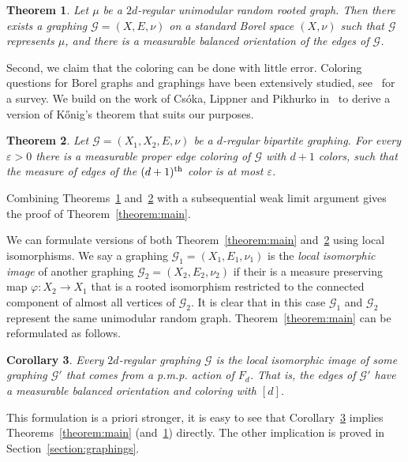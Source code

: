 \documentclass[11pt]{article}
\newtheorem{theo}{Theorem}[section]
\newtheorem{coro}[theo]{Corollary}
\theoremstyle{definition}
\numberwithin{equation}{section}
\numberwithin{figure}{section}
\numberwithin{table}{section}
\newcommand{\G}{\mathcal{G}}
\begin{document}
\begin{theo}\label{theorem:balanced_orientation}
Let $\mu$ be a $2d$-regular unimodular random rooted graph. Then there exists a graphing $\G=(X,E,\nu)$ on a standard Borel space $(X, \nu)$ such that $\G$ represents $\mu$, and there is a measurable balanced orientation of the edges of $\G$.
\end{theo}

Second, we claim that the coloring can be done with little error. Coloring questions for Borel graphs and graphings have been extensively studied, see~\cite{kechris2015descriptive} for a survey. We build on the work of Cs{\'o}ka, Lippner and Pikhurko in~\cite{csoka2016kHonig} to derive a version of K{\H o}nig's theorem that suits our purposes.

\begin{theo}\label{theorem:almost_proper_coloring}
Let $\G=(X_1,X_2,E, \nu)$ be a $d$-regular bipartite graphing. For every $\varepsilon > 0$ there is a measurable proper edge coloring of $\G$ with $d+1$ colors, such that the measure of edges of the $(d+1)^{\rm th}$ color is at most $\varepsilon$.
\end{theo}
Combining Theorems~\ref{theorem:balanced_orientation} and~\ref{theorem:almost_proper_coloring} with a subsequential weak limit argument gives the proof of Theorem~\ref{theorem:main}.
%

We can formulate versions of both Theorem~\ref{theorem:main} and~\ref{theorem:almost_proper_coloring} using local isomorphisms. We say a graphing $\G_1=(X_1, E_1, \nu_1)$ is the \emph{local isomorphic image} of another graphing $\G_2=(X_2, E_2, \nu_2)$ if their is a measure preserving map $\varphi: X_2 \to X_1$ that is a rooted isomorphism restricted to the connected component of almost all vertices of $\G_2$. It is clear that in this case $\G_1$ and $\G_2$ represent the same unimodular random graph. Theorem~\ref{theorem:main} can be reformulated as follows.

\begin{coro}\label{corollary:graphing_lift}
Every $2d$-regular graphing $\G$ is the local isomorphic image of some graphing $\G'$ that comes from a p.m.p. action of $F_d$. That is, the edges of $\G'$ have a measurable balanced orientation and coloring with $[d]$.
\end{coro}

This formulation is a priori stronger, it is easy to see that Corollary~\ref{corollary:graphing_lift} implies Theorems~\ref{theorem:main} (and~\ref{theorem:balanced_orientation}) directly. The other implication is proved in Section~\ref{section:graphings}.
\end{document}
